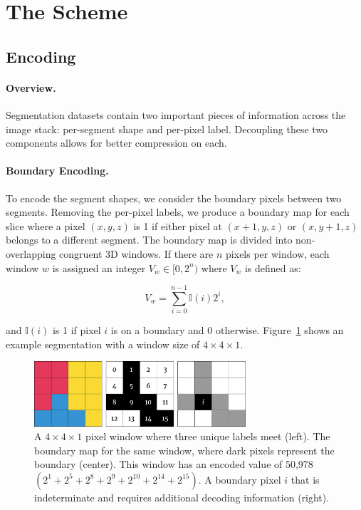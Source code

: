 \section{The \appName Scheme} \label{sec:m}

\subsection{Encoding}

\paragraph{Overview.}

Segmentation datasets contain two important pieces of information across the image stack: per-segment shape and per-pixel label. 
Decoupling these two components allows for better compression on each.

\paragraph{Boundary Encoding.}
\label{sec:boundary-map}

To encode the segment shapes, we consider the boundary pixels between two segments. 
Removing the per-pixel labels, we produce a boundary map for each slice where a pixel $(x, y, z)$ is 1 if either pixel at $(x + 1, y, z)$ or $(x, y + 1, z)$ belongs to a different segment. 
The boundary map is divided into non-overlapping congruent 3D windows. If there are $n$ pixels per window, each window $w$ is assigned an integer $V_w \in [0, 2^n)$ where $V_w$ is defined as:

\begin{equation}
V_w = \sum_{i = 0}^{n - 1} \mathbb{I}(i) 2^i,
\end{equation}

\noindent
and $\mathbb{I}(i)$ is 1 if pixel $i$ is on a boundary and 0 otherwise. 
Figure~\ref{fig:bockwurst-encoding} shows an example segmentation with a window size of $4 \times 4 \times 1$.

\begin{figure}[h]
  \begin{center}
    \includegraphics[width=0.7\textwidth]{gfx/encoding_diagram_opt.pdf}
  \end{center}
  \caption{A $4 \times 4 \times 1$ pixel window where three unique labels meet (left). The boundary map for the same window, where dark pixels represent the boundary (center). This window has an encoded value of 50,978 $(2^1 + 2^5 + 2^8 + 2^9 + 2^{10} + 2^{14} + 2^{15})$. A boundary pixel $i$ that is indeterminate and requires additional decoding information (right).}
  \label{fig:bockwurst-encoding}
\end{figure}

